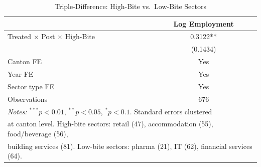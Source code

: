 \begin{table}[htbp]
\centering
\caption{Triple-Difference: High-Bite vs.\ Low-Bite Sectors}
\label{tab:ddd}
\begin{tabular}{lc}
\hline\hline
 & Log Employment \\
\hline
Treated $\times$ Post $\times$ High-Bite & 0.3122** \\
 & (0.1434) \\
\hline
Canton FE & Yes \\
Year FE & Yes \\
Sector type FE & Yes \\
Observations & 676 \\
\hline\hline
\multicolumn{2}{l}{\footnotesize \textit{Notes:} $^{***}p<0.01$, $^{**}p<0.05$, $^{*}p<0.1$. Standard errors clustered} \\
\multicolumn{2}{l}{\footnotesize at canton level. High-bite sectors: retail (47), accommodation (55), food/beverage (56),} \\
\multicolumn{2}{l}{\footnotesize building services (81). Low-bite sectors: pharma (21), IT (62), financial services (64).} \\
\end{tabular}
\end{table}

